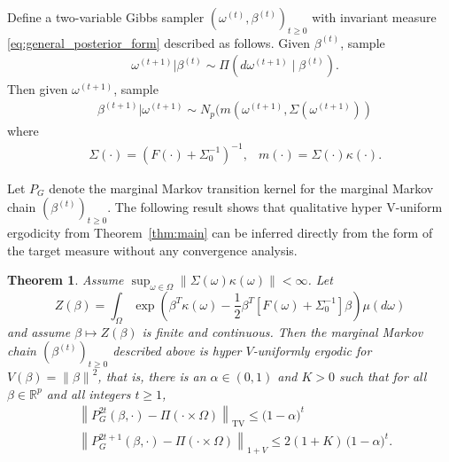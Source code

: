 \documentclass[ejsv2, noshowframe]{imsart}
\theoremstyle{plain}
\newtheorem{theorem}{Theorem}[section]
\theoremstyle{definition}
\theoremstyle{remark}
\newcommand{\norm}[1]{\left\lVert#1\right\rVert}
\newcommand{\w}{\omega}
\newcommand{\R}{\mathbb{R}}
\renewcommand{\P}{P}
\begin{document}
Define a two-variable Gibbs sampler $(\w^{(t)}, \beta^{(t)})_{t \ge 0}$ with invariant measure \eqref{eq:general_posterior_form} described as follows.
Given $\beta^{(t)}$, sample
\begin{align}
&\w^{(t+1)} | \beta^{(t)} \sim \Pi(d\w^{(t+1)} \mid \beta^{(t)}).
\end{align}
Then given $\w^{(t+1)}$, sample
\begin{align}
&\beta^{(t+1)} | \w^{(t+1)} \sim N_p(m(\w^{(t+1)}, \Sigma(\w^{(t+1)}))
\label{eq:general_gibbs_sampler_form}
\end{align}
where
\begin{align*}
&\Sigma(\cdot) = \left( F(\cdot) + \Sigma_0^{-1} \right)^{-1},
&m(\cdot) = \Sigma(\cdot) \kappa(\cdot).
\end{align*}

Let $\P_G$ denote the marginal Markov transition kernel for the marginal Markov chain $(\beta^{(t)})_{t \ge 0}$.
The following result shows that qualitative hyper V-uniform ergodicity from Theorem~\ref{thm:main} can be inferred directly from the form of the target measure without any convergence analysis.

\begin{theorem} \label{thm:general_posterior_convergence}
Assume $\sup_{\w \in \Omega} \norm{ \Sigma(\w) \kappa(\w) } < \infty$.
Let
\[
Z(\beta) = \int_{\Omega} \exp\left( \beta^T \kappa(\w) -\frac{1}{2} \beta^T \left[ F(\w) + \Sigma_0^{-1} \right] \beta \right) \mu(d\w)
\]
and assume $\beta \mapsto Z(\beta)$ is finite and continuous.
Then the marginal Markov chain $(\beta^{(t)})_{t \ge 0}$ described above is hyper $V$-uniformly ergodic for $V(\beta) = \norm{\beta}^2$, that is, there is an $\alpha \in (0, 1)$ and $K > 0$ such that for all $\beta \in \R^p$ and all integers $t \ge 1$,
\begin{align*}
&\norm{P_G^{2t}(\beta, \cdot) -  \Pi(\cdot \times \Omega)}_{\mathrm{TV}}
\le \big(1 - \alpha \big)^t
\\
&\norm{P_G^{2t+1}(\beta, \cdot) -  \Pi(\cdot \times \Omega)}_{1 + V}
\le 2( 1 + K) \, \big(1 - \alpha \big)^t.
\end{align*}
\end{theorem}
\end{document}
